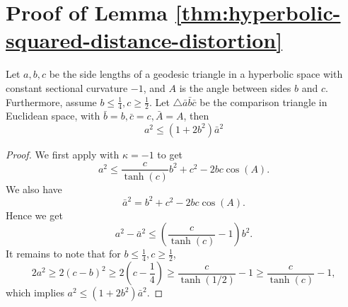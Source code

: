 \section{Proof of Lemma \ref{thm:hyperbolic-squared-distance-distortion}}
\begin{lemma} \label{thm:large-c-hyperbolic}
	Let $a,b,c$ be the side lengths of a geodesic triangle in a hyperbolic space with constant sectional curvature $-1$, and $A$ is the angle between sides $b$ and $c$. Furthermore, assume $b\le\frac{1}{4},c\ge\frac{1}{2}$. Let $\triangle\bar{a}\bar{b}\bar{c}$ be the comparison triangle in Euclidean space, with $\bar{b}=b,\bar{c}=c,\bar{A}=A$, then
	\begin{equation}
	a^2\le (1+2b^2)\bar{a}^2
	\end{equation}
\end{lemma}
\begin{proof}
	We first apply \citep[Lemma 5]{zhang2016first} with $\kappa=-1$ to get 
	\begin{equation*}
	a^2 \le \frac{c}{\tanh(c)}b^2 + c^2 - 2bc\cos(A).
	\end{equation*}
	We also have
	\[ \bar{a}^2 = b^2 + c^2 - 2bc\cos(A). \]
	Hence we get
	\[ a^2-\bar{a}^2\le \left(\frac{c}{\tanh(c)}-1\right)b^2. \]
	It remains to note that for $b\le\frac{1}{4},c\ge\frac{1}{2}$,
	\[ 2a^2\ge 2(c-b)^2\ge 2\left(c-\frac{1}{4}\right)\ge\frac{c}{\tanh(1/2)}-1\ge\frac{c}{\tanh(c)}-1, \]
	which implies $a^2\le(1+2b^2)\bar{a}^2$.
\end{proof}


